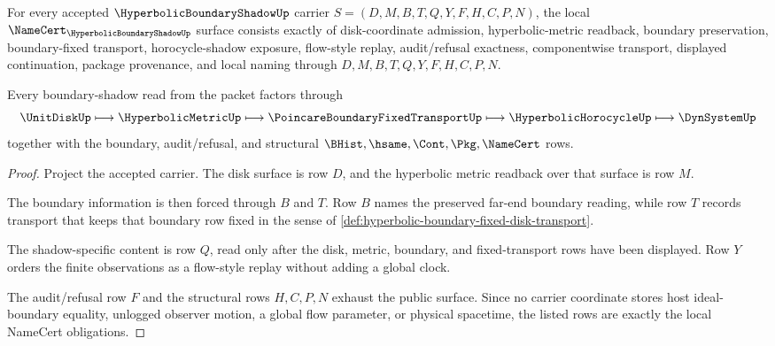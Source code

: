 \begin{theorem}
\label{thm:hyperbolic-boundary-shadow-namecert-obligations}
For every accepted $\HyperbolicBoundaryShadowUp$ carrier
$S=(D,M,B,T,Q,Y,F,H,C,P,N)$, the local
$\NameCert_{\HyperbolicBoundaryShadowUp}$ surface consists exactly of
disk-coordinate admission, hyperbolic-metric readback, boundary preservation,
boundary-fixed transport, horocycle-shadow exposure, flow-style replay,
audit/refusal exactness, componentwise transport, displayed continuation,
package provenance, and local naming through $D,M,B,T,Q,Y,F,H,C,P,N$.

Every boundary-shadow read from the packet factors through
$$
\UnitDiskUp \longmapsto \HyperbolicMetricUp \longmapsto
\PoincareBoundaryFixedTransportUp \longmapsto \HyperbolicHorocycleUp
\longmapsto \DynSystemUp
$$
together with the boundary, audit/refusal, and structural
$\BHist,\hsame,\Cont,\Pkg,\NameCert$ rows.
\end{theorem}
\begin{proof}
Project the accepted carrier. The disk surface is row $D$, and the
hyperbolic metric readback over that surface is row $M$.

The boundary information is then forced through $B$ and $T$. Row $B$ names the
preserved far-end boundary reading, while row $T$ records transport that keeps
that boundary row fixed in the sense of
\autoref{def:hyperbolic-boundary-fixed-disk-transport}.

The shadow-specific content is row $Q$, read only after the disk, metric,
boundary, and fixed-transport rows have been displayed. Row $Y$ orders the
finite observations as a flow-style replay without adding a global clock.

The audit/refusal row $F$ and the structural rows $H,C,P,N$ exhaust the public
surface. Since no carrier coordinate stores host ideal-boundary equality,
unlogged observer motion, a global flow parameter, or physical spacetime, the
listed rows are exactly the local NameCert obligations.
\end{proof}


